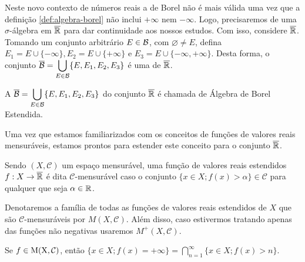     Neste novo contexto de números reais a \sigal de Borel não é mais válida uma vez que a definição \ref{def:algebra-borel} não inclui $+\infty$ nem $-\infty$.
    Logo, precisaremos de uma $\sigma$-álgebra em $\operatorname{\overline{\mathbb{R}}}$ para dar continuidade aos nossos estudos. 
    Com isso, considere $\operatorname{\overline{\mathbb{R}}}$.
    Tomando um conjunto arbitrário $E \in \operatorname{\mathcal{B}}$, com $\varnothing \neq E$, defina $E_1 = E \cup \{-\infty\}, E_2 = E \cup \{+\infty\}$ e $E_3 = E \cup \{-\infty, +\infty\}$. 
    Desta forma, o conjunto $\overline{\operatorname{\mathcal{B}}} = \displaystyle \bigcup_{E \in \operatorname{\mathcal{B}}} \{E, E_1, E_2, E_3\}$ é uma \sigal de $\operatorname{\overline{\mathbb{R}}}$.
    \begin{comment}
    Com efeito, se $E \in \borel$, então é um intervalo aberto conforme o teorema \ref{teo:equiv-borel}.
    Assim, $E_1, E_2, E_3$ e $E_4$ serão intervalos do tipo $[-\infty,x)$ ou $(x, +\infty]$ que são elementos de $\borel$ acrescidos de $+\infty$ ou $-\infty$. 
    Deste modo, é fácil verificar que se um elemento $A \in \xborel$, então $A^c \in \xborel$.
    Além disso, a união enumerável é, no máximo, o intervalo $[-\infty,+\infty]$ que é exatamente $\xreta$.
    Desta forma, $\xborel$ é uma \sigal de $\xreta$.
    	
    \end{comment}
    
    \begin{definition}
    \label{def:algebra-borel-estendida}
        A \sigal $\overline{\operatorname{\mathcal{B}}} = \displaystyle \bigcup_{E \in \operatorname{\mathcal{B}}} \{E, E_1, E_2, E_3\}$ do conjunto $\operatorname{\overline{\mathbb{R}}}$ é chamada de Álgebra de Borel Estendida. 
    \end{definition}

    Uma vez que estamos familiarizados com os conceitos de funções de valores reais mensuráveis, estamos prontos para estender este conceito para o conjunto $\operatorname{\overline{\mathbb{R}}}$.

    \begin{definition}
    \label{def:familia-funcoes-mensuraveis}
        Sendo $(X, \mathcal{C})$ um espaço mensurável, uma função de valores reais estendidos $f: X \to \operatorname{\overline{\mathbb{R}}}$ é dita $\mathcal{C}$-mensurável caso o conjunto
        $\{x \in X; f(x) > \alpha\} \in \mathcal{C}$ para qualquer que seja $\alpha \in \mathbb{R}$. 
    \end{definition}

	Denotaremos a família de todas as funções de valores reais estendidos de $X$ que são $\mathcal{C}$-mensuráveis por $M(X, \mathcal{C})$.
	Além disso, caso estivermos tratando apenas das funções não negativas usaremos $M^+(X, \mathcal{C})$.
    \begin{proposition}
    \label{prop:identidade-intersecao-mais-infinito}
        Se $f \in \operatorname{M(X, \mathcal{C} )}$, então $\{x \in X; f(x) = +\infty\} = \displaystyle \bigcap_{n = 1}^\infty \{x \in X; f(x) > n\}$.
    \end{proposition}

